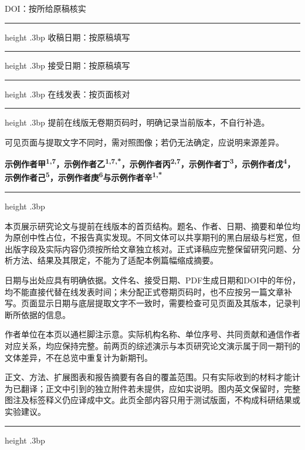 \documentclass[UTF8,fontset=none,twocolumn,scheme=plain]{ctexart}
\begin{document}
\noindent\begin{minipage}[t]{166.3bp}\vspace{0pt}\sffamily\fontsize{7.8bp}{10.5bp}\selectfont
DOI：按所给原稿核实\par\vspace{4bp}\hrule height .3bp\vspace{4bp}
收稿日期：按原稿填写\par\vspace{4bp}\hrule height .3bp\vspace{4bp}
接受日期：按原稿填写\par\vspace{4bp}\hrule height .3bp\vspace{4bp}
在线发表：按页面核对\par\vspace{4bp}\hrule height .3bp\vspace{7bp}
提前在线版无卷期页码时，明确记录当前版本，不自行补造。\par\smallskip
可见页面与提取文字不同时，需对照图像；若仍无法确定，应说明来源差异。
\end{minipage}\hfill\begin{minipage}[t]{343.9bp}\vspace{0pt}
{\sffamily\bfseries\fontsize{8.7bp}{11.5bp}\selectfont
示例作者甲\textsuperscript{1,7}，示例作者乙\textsuperscript{1,7,*}，示例作者丙\textsuperscript{2,7}，示例作者丁\textsuperscript{3}，示例作者戊\textsuperscript{4}，示例作者己\textsuperscript{5}，示例作者庚\textsuperscript{6}与示例作者辛\textsuperscript{1,*}\par}
\vspace{11bp}\hrule height .3bp\vspace{6bp}
{\fontsize{10.2bp}{14bp}\selectfont\setlength{\parindent}{0pt}
本页展示研究论文与提前在线版本的首页结构。题名、作者、日期、摘要和单位均为原创中性占位，不报告真实发现。不同文体可以共享期刊的黑白层级与栏宽，但出版字段及实际内容仍须按所给文章独立核对。正式译稿应完整保留研究问题、分析方法、结果及其限定，不能为了适配本例篇幅缩成摘要。\par\smallskip
日期与出处应具有明确依据。文件名、接受日期、PDF生成日期和DOI中的年份，均不能直接代替在线发表时间；未分配正式卷期页码时，也不应按另一篇文章补写。页面显示日期与底层提取文字不一致时，需要检查可见页面及其版本，记录判断所依据的信息。\par\smallskip
作者单位在本页以通栏脚注示意。实际机构名称、单位序号、共同贡献和通信作者对应关系，均应保持完整。前两页的综述演示与本页研究论文演示属于同一期刊的文体差异，不在总览中重复计为新期刊。\par\smallskip
正文、方法、扩展图表和报告摘要有各自的覆盖范围。只有实际收到的材料才能计为已翻译；正文中引到的独立附件若未提供，应如实说明。图内英文保留时，完整图注及标签释义仍应译成中文。此页全部内容只用于测试版面，不构成科研结果或实验建议。
\par}
\end{minipage}\par\vspace{10bp}\hrule height .3bp\vspace{9bp}
\end{document}
